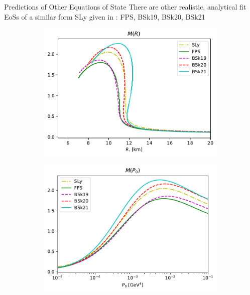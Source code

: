 \documentclass[]{beamer}
\begin{document}
    \begin{frame}{Predictions of Other Equations of State}
        \pause
        There are other realistic, analytical fit EoSs of a similar form SLy given in \autocite{SLy_2004,BSk_2013}: \pause FPS, BSk19, BSk20, BSk21 \pause
        \vspace{-10pt}
        \begin{figure}[h!]
            \centering
            \begin{subfigure}{.5\textwidth}
                \includegraphics[width = \textwidth]{r_analysis,all.pdf}
            \end{subfigure}%
            \begin{subfigure}{.5\textwidth}
                \includegraphics[width = \textwidth]{p0_analysis,all.pdf} 

\end{subfigure}
\end{figure}
\end{frame}
\end{document}
